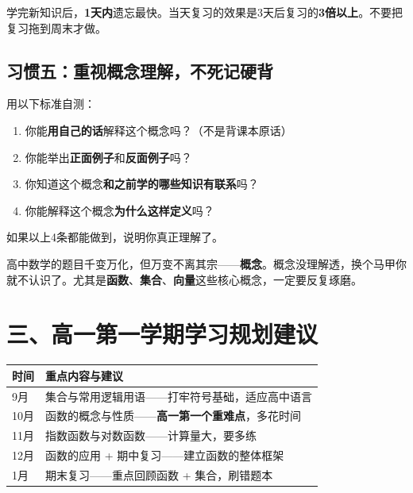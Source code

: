 \documentclass[12pt, a4paper]{ctexart}
\begin{document}
\begin{tipbox}[艾宾浩斯遗忘曲线告诉我们]
学完新知识后，\textbf{1天内}遗忘最快。当天复习的效果是3天后复习的\textbf{3倍以上}。不要把复习拖到周末才做。
\end{tipbox}

\subsection*{习惯五：重视概念理解，不死记硬背}

\begin{knowledgebox}
用以下标准自测：
\begin{enumerate}[leftmargin=2.5em]
  \item 你能\textbf{用自己的话}解释这个概念吗？（不是背课本原话）
  \item 你能举出\textbf{正面例子}和\textbf{反面例子}吗？
  \item 你知道这个概念\textbf{和之前学的哪些知识有联系}吗？
  \item 你能解释这个概念\textbf{为什么这样定义}吗？
\end{enumerate}
如果以上4条都能做到，说明你真正理解了。
\end{knowledgebox}

\begin{warnbox}[死记硬背的后果]
高中数学的题目千变万化，但万变不离其宗——\textbf{概念}。概念没理解透，换个马甲你就不认识了。尤其是\textbf{函数}、\textbf{集合}、\textbf{向量}这些核心概念，一定要反复琢磨。
\end{warnbox}


\section*{\textcolor{mainblue}{三、高一第一学期学习规划建议}}

\begin{knowledgebox}[高一上学期时间线]
\renewcommand{\arraystretch}{1.5}
\begin{center}
\begin{tabular}{l p{9cm}}
\toprule
\textbf{时间} & \textbf{重点内容与建议} \\
\midrule
9月 & 集合与常用逻辑用语——打牢符号基础，适应高中语言 \\
10月 & 函数的概念与性质——\textbf{高一第一个重难点}，多花时间 \\
11月 & 指数函数与对数函数——计算量大，要多练 \\
12月 & 函数的应用 + 期中复习——建立函数的整体框架 \\
1月 & 期末复习——重点回顾函数 + 集合，刷错题本 \\
\bottomrule
\end{tabular}
\end{center}
\end{knowledgebox}
\end{document}
